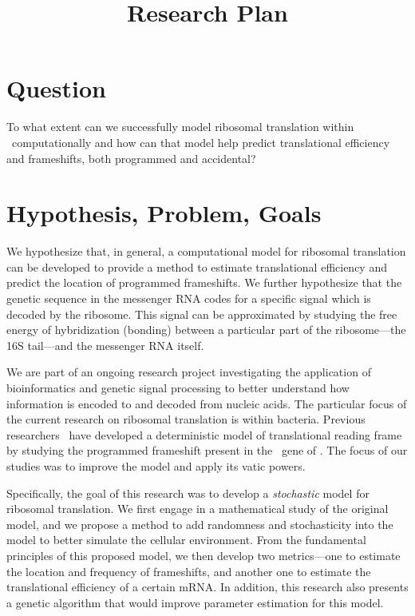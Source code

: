 \documentclass[article, oneside]{memoir}
\author{\BWFauthors}
\title{Research Plan}
\begin{document}
\nocite{*}
\maketitle

\section{Question}
To what extent can we successfully model ribosomal translation within
\ecoli\ computationally and how can that model help predict
translational efficiency and frameshifts, both programmed and
accidental?

\section{Hypothesis, Problem, Goals}
We hypothesize that, in general, a computational model for ribosomal
translation can be developed to provide a method to estimate translational
efficiency and predict the location of programmed frameshifts.  We further
hypothesize that the genetic sequence in the messenger RNA codes for a 
specific signal which is decoded by the ribosome.  This signal can be 
approximated by studying the free energy of hybridization (bonding) between
a particular part of the ribosome---the 16S tail---and the messenger RNA itself.

We are part of an ongoing research project
investigating the application of bioinformatics
and genetic signal processing to better understand how
information is encoded to and decoded from nucleic acids.  The particular
focus of the current research on ribosomal translation is within
bacteria.  Previous researchers~\cite{lalit:mechanics}
have developed a deterministic model
of translational reading frame by studying the
programmed frameshift present in the \prfB\ gene of \ecoli.  The focus
of our studies was to improve the model and apply its vatic powers.

Specifically, the goal of this research was to develop a 
\emph{stochastic} model for ribosomal translation.  We first engage in
a mathematical study of the original model, and we propose a method
to add randomness and stochasticity into the model to better simulate
the cellular environment.  From the fundamental principles of this
proposed model, we then develop two metrics---one to estimate the
location and frequency of frameshifts, and another one to estimate the
translational efficiency of a certain mRNA.  In addition, this research
also presents a genetic algorithm that would improve parameter estimation
for this model.
\end{document}
